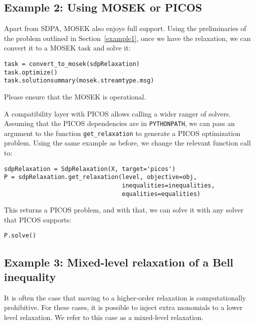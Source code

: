 \documentclass{article}
\begin{document}
\subsection{Example 2: Using MOSEK or PICOS}
Apart from SDPA, MOSEK also enjoys full support. Using the preliminaries of the problem outlined in Section~\ref{example1}, once we have the relaxation, we can convert it to a MOSEK task and solve it:

\begin{verbatim}
task = convert_to_mosek(sdpRelaxation)
task.optimize()
task.solutionsummary(mosek.streamtype.msg)
\end{verbatim}
Please ensure that the MOSEK is operational.

A compatibility layer with PICOS allows calling a wider ranger of solvers. Assuming that the PICOS dependencies are in \verb+PYTHONPATH+, we can pass an argument to the function \verb+get_relaxation+ to generate a PICOS optimization problem. Using the same example as before, we change the relevant function call to:
\begin{verbatim}
sdpRelaxation = SdpRelaxation(X, target='picos')
P = sdpRelaxation.get_relaxation(level, objective=obj,
                                 inequalities=inequalities,
                                 equalities=equalities)
\end{verbatim}
This returns a PICOS problem, and with that, we can solve it with any solver that PICOS supports:
\begin{verbatim}
P.solve()
\end{verbatim}

\subsection{Example 3: Mixed-level relaxation of a Bell inequality}\label{mixedlevel}
It is often the case that moving to a higher-order relaxation is computationally prohibitive. For these cases, it is possible to inject extra monomials to a lower level relaxation. We refer to this case as a mixed-level relaxation.
\end{document}
